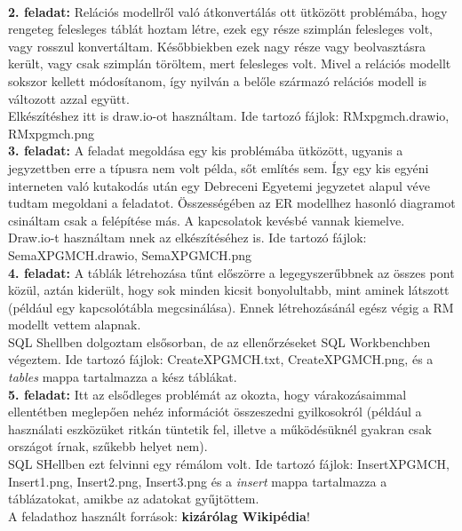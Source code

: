 \documentclass[12pt]{article}
\begin{document}
\\
\textbf{2. feladat:} Relációs modellről való átkonvertálás ott ütközött problémába, hogy rengeteg felesleges táblát hoztam létre, ezek egy része szimplán felesleges volt, vagy rosszul konvertáltam. Későbbiekben ezek nagy része vagy beolvasztásra került, vagy csak szimplán töröltem, mert felesleges volt. Mivel a relációs modellt sokszor kellett módosítanom, így nyilván a belőle származó relációs modell is változott azzal együtt. \\
Elkészítéshez itt is draw.io-ot használtam. Ide tartozó fájlok: RMxpgmch.drawio, RMxpgmch.png \\
\textbf{3. feladat:} A feladat megoldása egy kis problémába ütközött, ugyanis a jegyzettben erre a típusra nem volt példa, sőt említés sem. Így egy kis egyéni interneten való kutakodás után egy Debreceni Egyetemi jegyzetet alapul véve tudtam megoldani a feladatot. Összességében az ER modellhez hasonló diagramot csináltam csak a felépítése más. A kapcsolatok kevésbé vannak kiemelve. \\
Draw.io-t használtam nnek az elkészítéséhez is. Ide tartozó fájlok: SemaXPGMCH.drawio, SemaXPGMCH.png \\
\textbf{4. feladat:} A táblák létrehozása tűnt előszörre a legegyszerűbbnek az összes pont közül, aztán kiderült, hogy sok minden kicsit bonyolultabb, mint aminek látszott (például egy kapcsolótábla megcsinálása). Ennek létrehozásánál egész végig a RM modellt vettem alapnak. \\
SQL Shellben dolgoztam elsősorban, de az ellenőrzéseket SQL Workbenchben végeztem. Ide tartozó fájlok: CreateXPGMCH.txt, CreateXPGMCH.png, és a \textit{tables} mappa tartalmazza a kész táblákat. \\
\textbf{5. feladat:} Itt az elsődleges problémát az okozta, hogy várakozásaimmal ellentétben meglepően nehéz információt összeszedni gyilkosokról (például a használati eszközüket ritkán tüntetik fel, illetve a működésüknél gyakran csak országot írnak, szűkebb helyet nem). \\
SQL SHellben ezt felvinni egy rémálom volt. Ide tartozó fájlok: InsertXPGMCH, Insert1.png, Insert2.png, Insert3.png és a \textit{insert} mappa tartalmazza a táblázatokat, amikbe az adatokat gyűjtöttem. \\
A feladathoz használt források: \textbf{kizárólag Wikipédia}!
\end{document}
